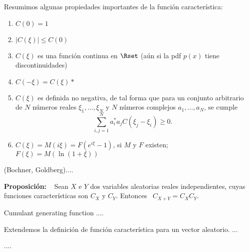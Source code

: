 {Resumimos algunas propiedades importantes de la funci\'on caracter\'istica:
\begin{enumerate}
\item $C(0) =1$
%
\item $|C(\xi)|\leq C(0)$ %
%
\item $C(\xi)$  es una  funci\'on continua  en $\Rset$ (a\'un  si la  pdf $p(x)$
  tiene discontinuidades) %
%
\item $C(-\xi) = C(\xi)*$
%
\item  $C(\xi)$ es  definida no  negativa,  de tal  forma que  para un  conjunto
  arbitrario  de  $N$  n\'umeros  reales $\xi_1,\ldots,\xi_N$  y  $N$  n\'umeros
  complejos $a_1,\ldots,a_N$, se cumple
  $$
  \sum_{i,j=1}^N a_i^* a_j C(\xi_j-\xi_i) \geq 0 .
  $$
%
\item  $C(\xi) =  M(i\xi) =  F(e^{i\xi}-1)$, si  $M$ y  $F$ existen;  \ $F(\xi)=
  M(\ln(1+\xi))$
\end{enumerate}

{\teorema (Bochner, Goldberg).... } %

\textbf{Proposici\'on:} \ %
Sean $X$ e  $Y$ dos variables aleatorias reales  independientes, cuyas funciones
caracter\'isticas son $C_X$ y $C_Y$. Entonces \ $C_{X+Y}=C_X C_Y$.

\hfill

Cumulant generating function .... %

\hfill

Extendemos  la  definici\'on  de   funci\'on  caracter\'istica  para  un  vector
aleatorio. ... %


....
}


